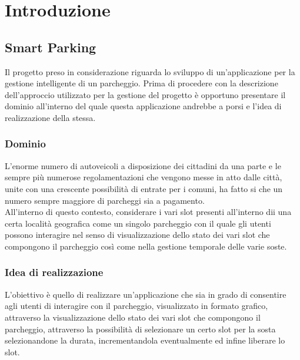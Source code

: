 \section*{Introduzione}
\subsection*{Smart Parking}
Il progetto preso in considerazione riguarda lo sviluppo di un'applicazione per la gestione intelligente di un parcheggio. Prima di procedere con la descrizione 
dell'approccio utilizzato per la gestione del progetto è opportuno presentare il dominio all'interno del quale questa applicazione andrebbe a porsi e l'idea di realizzazione della stessa.
\subsubsection*{Dominio}
L'enorme numero di autoveicoli a disposizione dei cittadini da una parte e le sempre più numerose regolamentazioni che vengono messe in atto dalle città, unite con una crescente possibilità di entrate per i comuni, ha fatto si che un numero sempre maggiore di parcheggi sia a pagamento. \\
All'interno di questo contesto, considerare i vari slot presenti all'interno dii una certa località geografica come un singolo parcheggio con il quale gli utenti possono interagire nel senso di visualizzazione dello stato dei vari slot che compongono il parcheggio così come nella gestione temporale delle varie soste.
\subsubsection*{Idea di realizzazione}
L'obiettivo è quello di realizzare un'applicazione che sia in grado di consentire agli utenti di interagire con il parcheggio, visualizzato in formato grafico, attraverso la visualizzazione dello stato dei vari slot che compongono il parcheggio, attraverso la possibilità di selezionare un certo slot per la sosta selezionandone la durata, incrementandola eventualmente ed infine liberare lo slot.